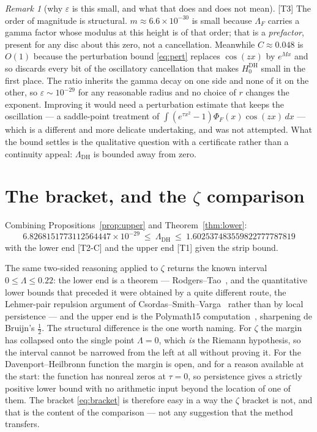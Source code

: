 \documentclass[11pt,a4paper]{article}
\theoremstyle{remark}
\newtheorem{remark}[theorem]{Remark}
\newcommand{\tier}[1]{{\small\textsf{[#1]}}}
\newcommand{\LamDH}{\Lambda_{\mathrm{DH}}}
\newcommand{\PhiF}{\Phi_F}
\newcommand{\HDH}{H^{\mathrm{DH}}}
\begin{document}
\begin{remark}[why $\varepsilon$ is this small, and what that does and does not mean]
\label{rem:small}
\tier{T3} The order of magnitude is structural. $m\approx 6.6\times10^{-30}$ is small because
$\Lambda_F$ carries a gamma factor whose modulus at this height is of that order; that is a
\emph{prefactor}, present for any disc about this zero, not a cancellation. Meanwhile
$C\approx 0.048$ is $O(1)$ because the perturbation bound \eqref{eq:pert} replaces
$\cos(zx)$ by $e^{Mx}$ and so discards every bit of the oscillatory cancellation that makes
$\HDH_0$ small in the first place. The ratio inherits the gamma decay on one side and none
of it on the other, so $\varepsilon\sim 10^{-29}$ for any reasonable radius and no choice of
$r$ changes the exponent. Improving it would need a perturbation estimate that keeps the
oscillation --- a saddle-point treatment of
$\int(e^{\tau x^2}-1)\PhiF(x)\cos(zx)\,dx$ --- which is a different and more delicate
undertaking, and was not attempted. What the bound settles is the qualitative question with
a certificate rather than a continuity appeal: $\LamDH$ is bounded away from zero.
\end{remark}

\section{The bracket, and the $\zeta$ comparison}\label{sec:bracket}

Combining Propositions~\ref{prop:upper} and Theorem~\ref{thm:lower}:
\begin{equation}\label{eq:bracket}
  \boxed{\ 6.8268151773112564447\times10^{-29}\ \le\ \LamDH\ \le\
  1.602537483559822777787819\ }
\end{equation}
with the lower end \tier{T2-C} and the upper end \tier{T1} given the strip bound.

The same two-sided reasoning applied to $\zeta$ returns the known interval
$0\le\Lambda\le0.22$: the lower end is a theorem --- Rodgers--Tao~\cite{RT}, and the
quantitative lower bounds that preceded it were obtained by a quite different route, the
Lehmer-pair repulsion argument of Csordas--Smith--Varga~\cite{CSV94} rather than by local
persistence --- and the upper end is the Polymath15 computation~\cite{P15}, sharpening de
Bruijn's $\tfrac12$. The structural difference is the one worth naming. For $\zeta$ the
margin has collapsed onto the single point $\Lambda=0$, which \emph{is} the Riemann
hypothesis, so the interval cannot be narrowed from the left at all without proving it. For
the Davenport--Heilbronn function the margin is open, and for a reason available at the
start: the function has nonreal zeros at $\tau=0$, so persistence gives a strictly positive
lower bound with no arithmetic input beyond the location of one of them. The bracket
\eqref{eq:bracket} is therefore easy in a way the $\zeta$ bracket is not, and that is the
content of the comparison --- not any suggestion that the method transfers.
\end{document}
